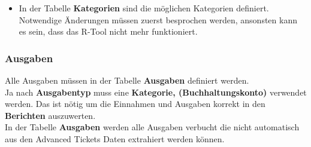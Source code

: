 \documentclass[
]{article}
\begin{document}
\begin{itemize}
\begin{itemize}
    Zu welcher Filmvorführung gehört diese Buchung?\\
    Das ist wichtig für die Kategorie Event und Verleiher, siehe oben.
  \item
    \textbf{Datum}\\
    Buchungsdatum
  \item
    \textbf{Abrechnungsjahr}\\
    In welche Abrechnungsperiode (Jahr) wird die Buchung zugewiesen?
  \item
    \textbf{Betrag}\\
    Betrag in {[}CHF{]}
  \item
    \textbf{Firmenname}\\
    Name der rechnugsstellenden Firma oder oder Person and die der
    Betrag ausbezahlt werden muss.
  \item
    \textbf{Adresse}\\
    Rechnungsteller
  \item
    \textbf{Rechnungsnummer}\\
    Rechnungsnummer des Rechnungsstellers
  \item
    \textbf{Buchungskonto}\\
    Buchungskonto in Bexio (Buchhaltungstool TaB), muss Geschäftsleitung
    weitergegeben werden um Buchung
  \end{itemize}
\item
  In der Tabelle \textbf{Kategorien} sind die möglichen Kategorien
  definiert. Notwendige Änderungen müssen zuerst besprochen werden,
  ansonsten kann es sein, dass das R-Tool nicht mehr funktioniert.
\end{itemize}

\subsubsection{Ausgaben}\label{ausgaben}

Alle Ausgaben müssen in der Tabelle \textbf{Ausgaben} definiert
werden.\\
Ja nach \textbf{Ausgabentyp} muss eine \textbf{Kategorie,
(Buchhaltungskonto)} verwendet werden. Das ist nötig um die Einnahmen
und Ausgaben korrekt in den \textbf{Berichten} auszuwerten.\\
In der Tabelle \textbf{Ausgaben} werden alle Ausgaben verbucht die nicht
automatisch aus den Advanced Tickets Daten extrahiert werden können.
\end{document}
